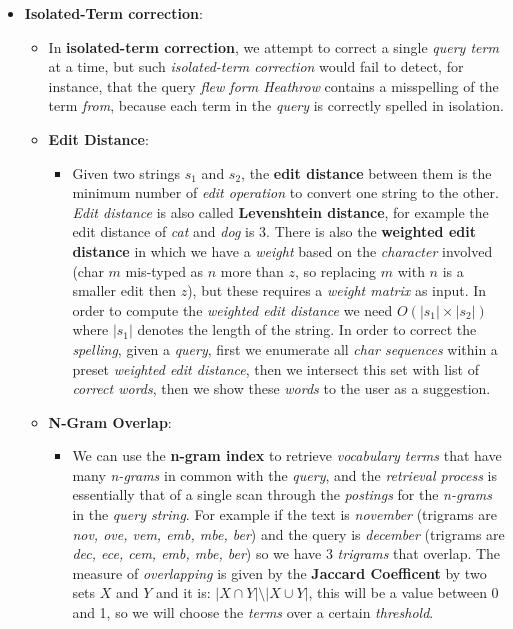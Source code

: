 \documentclass{article}
\begin{document}
\begin{itemize}
\item \textbf{Isolated-Term correction}: 
\begin{itemize}
\item  In \textbf{isolated-term correction}, we attempt to correct a single \emph{query term} at a time, but such \emph{isolated-term correction} would fail to detect, for instance, that the query \emph{flew form Heathrow} contains a misspelling of the term \emph{from}, because each term in the \emph{query} is correctly spelled in isolation.
\item \textbf{Edit Distance}:
\begin{itemize}
\item Given two strings $s_1$ and $s_2$, the \textbf{edit distance} between them is the minimum number of \emph{edit operation} to convert one string to the other. \emph{Edit distance} is also called \textbf{Levenshtein distance}, for example the edit distance of \emph{cat} and \emph{dog} is 3. There is also the \textbf{weighted edit distance} in which we have a \emph{weight} based on the \emph{character} involved (char $m$ mis-typed as $n$ more than $z$, so replacing $m$ with $n$ is a smaller edit then $z$), but these requires a \emph{weight matrix} as input. In order to compute the\emph{ weighted edit distance} we need $O(|s_1| \times |s_2|)$ where $|s_1|$ denotes the length of the string. In order to correct the \emph{spelling}, given a \emph{query}, first we enumerate all \emph{char sequences} within a preset \emph{weighted edit distance}, then we intersect this set with list of \emph{correct words}, then we show these \emph{words} to the user as a suggestion. 
\end{itemize}
\item \textbf{N-Gram Overlap}:
\begin{itemize}
\item We can use the \textbf{n-gram index} to retrieve \emph{vocabulary terms} that have many\emph{ n-grams} in common with the \emph{query}, and the \emph{retrieval process} is essentially that of a single scan through the \emph{postings} for the\emph{ n-grams} in the \emph{query string}. For example if the text is \emph{november} (trigrams are \emph{nov, ove, vem, emb, mbe, ber}) and the query is \emph{december} (trigrams are \emph{dec, ece, cem, emb, mbe, ber}) so we have 3 \emph{trigrams} that overlap. The measure of \emph{overlapping} is given by the \textbf{Jaccard Coefficent} by two sets $X$ and $Y$ and it is: $|X \cap Y| \setminus |X \cup Y|$, this will be a value between 0 and 1, so we will choose the \emph{terms} over a certain \emph{threshold}. 

\end{itemize}
\end{itemize}
\end{itemize}
\end{document}
